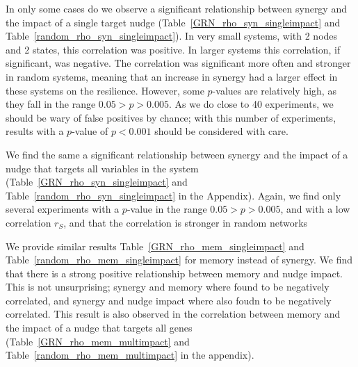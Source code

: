 \documentclass[../main.tex]{subfiles}
\begin{document}
In only some cases do we observe a significant relationship between synergy and the impact of a single target nudge (Table~\ref{GRN_rho_syn_singleimpact} and Table~\ref{random_rho_syn_singleimpact}).
In very small systems, with 2 nodes and 2 states, this correlation was positive.
In larger systems this correlation, if significant, was negative.
The correlation was significant more often and stronger in random systems, meaning that an increase in synergy had a larger effect in these systems on the resilience.
However, some $p$-values are relatively high, as they fall in the range $0.05 > p > 0.005$.
As we do close to 40 experiments, we should be wary of false positives by chance; with this number of experiments, results with a $p$-value of $p < 0.001$ should be considered with care.

We find the same a significant relationship between synergy and the impact of a nudge that targets all variables in the system (Table~\ref{GRN_rho_syn_singleimpact} and Table~\ref{random_rho_syn_singleimpact} in the Appendix).
Again, we find only several experiments with a $p$-value in the range $0.05 > p > 0.005$, and with a low correlation $r_S$, and that the correlation is stronger in random networks

We provide similar results Table~\ref{GRN_rho_mem_singleimpact} and Table~\ref{random_rho_mem_singleimpact} for memory instead of synergy.
We find that there is a strong positive relationship between memory and nudge impact.
This is not unsurprising; synergy and memory where found to be negatively correlated, and synergy and nudge impact where also foudn to be negatively correlated.
This result is also observed in the correlation between memory and the impact of a nudge that targets all genes (Table~\ref{GRN_rho_mem_multimpact} and Table~\ref{random_rho_mem_multimpact} in the appendix).
\end{document}
